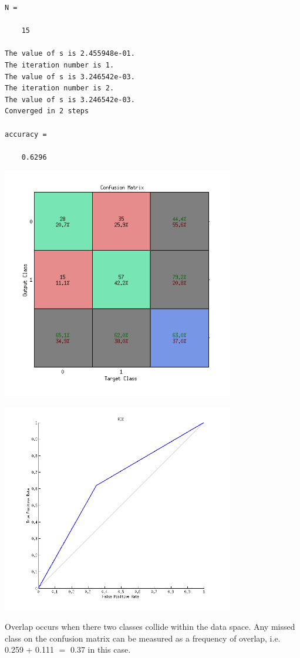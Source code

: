 \documentclass[12pt,letterpaper]{article}
\begin{document}
        \color{lightgray} \begin{verbatim}
N =

    15

The value of s is 2.455948e-01.
The iteration number is 1.
The value of s is 3.246542e-03.
The iteration number is 2.
The value of s is 3.246542e-03.
Converged in 2 steps

accuracy =

    0.6296

\end{verbatim} \color{black}

\includegraphics [width=4in]{HW3_SetVirandVerCM.png}

\includegraphics [width=4in]{HW3_SetVirandVerROC.png}

Overlap occurs when there two classes collide within the data space. Any missed class on the confusion matrix can be measured as a frequency of overlap, i.e. 0.259 + 0.111 $= $ 0.37  in this case.
\end{document}
